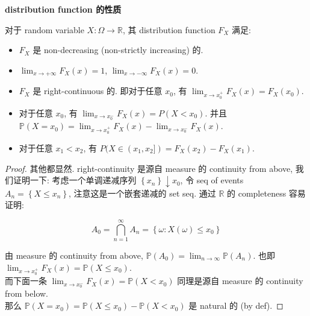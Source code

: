 \documentclass{qlnotes-export}
\begin{document}
\begin{theorem}{\protect{}\label{kn-distribution-function}{\textbf{distribution
function 的性质}}}\label{thm-02-random-variables-distribution-function}

对于 random variable \(X:\Omega\rightarrow{\mathbb{R}}\), 其 distribution function \(F_{X}\) 满足:

\begin{itemize}
\item
  \(F_{X}\) 是 non-decreasing (non-strictly increasing) 的.
\item
  \(\lim_{x\rightarrow + \infty}F_{X}(x) = 1\), \(\lim_{x\rightarrow - \infty}F_{X}(x) = 0\).
\item
  \(F_{X}\) 是 right-continuous 的. 即对于任意 \(x_{0}\), 有 \(\lim_{x\rightarrow x_{0}^{+}}F_{X}(x) = F_{X}(x_{0})\).
\item
  对于任意 \(x_{0}\), 有 \(\lim_{x\rightarrow x_{0}^{-}}F_{X}(x) = P(X < x_{0})\). 并且 \({\mathbb{P}}(X = x_{0}) = \lim_{x\rightarrow x_{0}^{+}}F_{X}(x) - \lim_{x\rightarrow x_{0}^{-}}F_{X}(x)\).
\item
  对于任意 \(x_{1} < x_{2}\), 有 \(P(X \in (x_{1},x_{2}\rbrack) = F_{X}(x_{2}) - F_{X}(x_{1})\).
\end{itemize}

\end{theorem}

\begin{proof}

其他都显然. right-continuity 是源自 measure 的 continuity from above, 我们证明一下: 考虑一个单调递减序列 \(\left\{ x_{n} \right\} \downarrow x_{0}\), 令 seq of events \(A_{n} = \left\{ {X \leq x_{n}} \right\}\), 注意这是一个嵌套递减的 set seq. 通过 \(\mathbb{R}\) 的 completeness 容易证明:

\[A_{0} = \bigcap\limits_{n = 1}^{\infty}A_{n} = \left\{ {\omega:X(\omega) \leq x_{0}} \right\}\]

由 measure 的 continuity from above, \({\mathbb{P}}(A_{0}) = \lim_{n\rightarrow\infty}{\mathbb{P}}(A_{n})\). 也即 \(\lim_{x\rightarrow x_{0}^{+}}F_{X}(x) = {\mathbb{P}}(X \leq x_{0})\).\\
而下面一条 \(\lim_{x\rightarrow x_{0}^{-}}F_{X}(x) = {\mathbb{P}}(X < x_{0})\) 同理是源自 measure 的 continuity from below.\\
那么 \({\mathbb{P}}(X = x_{0}) = {\mathbb{P}}(X \leq x_{0}) - {\mathbb{P}}(X < x_{0})\) 是 natural 的 (by def).

\end{proof}
\end{document}
